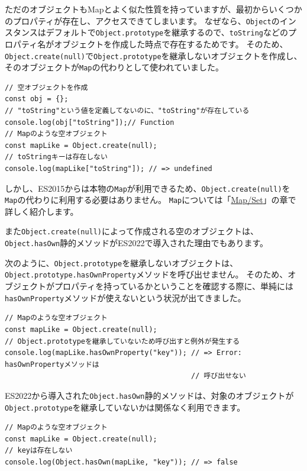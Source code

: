 ただのオブジェクトもMapとよく似た性質を持っていますが、最初からいくつかのプロパティが存在し、アクセスできてしまいます。
なぜなら、\texttt{Object}のインスタンスはデフォルトで\texttt{Object.prototype}を継承するので、\texttt{toString}などのプロパティ名がオブジェクトを作成した時点で存在するためです。
そのため、\texttt{Object.create(null)}で\texttt{Object.prototype}を継承しないオブジェクトを作成し、そのオブジェクトが\texttt{Map}の代わりとして使われていました。

\begin{lstlisting}
// 空オブジェクトを作成
const obj = {};
// "toString"という値を定義してないのに、"toString"が存在している
console.log(obj["toString"]);// Function
// Mapのような空オブジェクト
const mapLike = Object.create(null);
// toStringキーは存在しない
console.log(mapLike["toString"]); // => undefined
\end{lstlisting}

しかし、ES2015からは本物の\texttt{Map}が利用できるため、\texttt{Object.create(null)}を\texttt{Map}の代わりに利用する必要はありません。
\texttt{Map}については「\hyperlink{map-and-set}{Map/Set}」の章で詳しく紹介します。

また\texttt{Object.create(null)}によって作成される空のオブジェクトは、\texttt{Object.hasOwn}静的メソッドがES2022で導入された理由でもあります。

次のように、\texttt{Object.prototype}を継承しないオブジェクトは、\texttt{Object.prototype.hasOwnProperty}メソッドを呼び出せません。
そのため、オブジェクトがプロパティを持っているかということを確認する際に、単純には\texttt{hasOwnProperty}メソッドが使えないという状況が出てきました。

\begin{lstlisting}
// Mapのような空オブジェクト
const mapLike = Object.create(null);
// Object.prototypeを継承していないため呼び出すと例外が発生する
console.log(mapLike.hasOwnProperty("key")); // => Error: hasOwnPropertyメソッドは
                                            // 呼び出せない
\end{lstlisting}

ES2022から導入された\texttt{Object.hasOwn}静的メソッドは、対象のオブジェクトが\texttt{Object.prototype}を継承していないかは関係なく利用できます。

\begin{lstlisting}
// Mapのような空オブジェクト
const mapLike = Object.create(null);
// keyは存在しない
console.log(Object.hasOwn(mapLike, "key")); // => false
\end{lstlisting}

